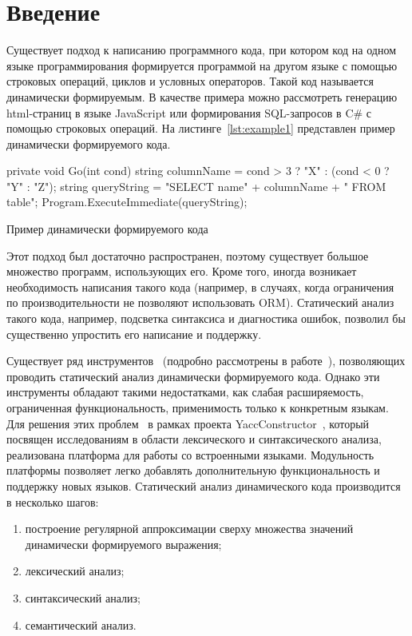\section*{Введение}
Существует подход к написанию программного кода, при котором код на одном языке программирования формируется программой на другом языке с помощью строковых операций, циклов и условных операторов. Такой код называется динамически формируемым. В качестве примера можно рассмотреть генерацию html-страниц в языке JavaScript или формирования SQL-запросов в C\# с помощью строковых операций. На листинге~\ref{lst:example1} представлен пример динамически формируемого кода.

\begin{listing}[H]
    \begin{pyglist}[language=csharp,numbers=left,numbersep=5pt]
 private void Go(int cond){
   string columnName = cond > 3 ? "X" : (cond < 0 ? "Y" : "Z");
   string queryString = 
       "SELECT name" + columnName + " FROM table";
   Program.ExecuteImmediate(queryString);}
    \end{pyglist}
\caption{Пример динамически формируемого кода}
\label{lst:example1}
\end{listing}

Этот подход был достаточно распространен, поэтому существует большое множество программ, использующих его. Кроме того, иногда возникает необходимость написания такого кода (например, в случаях, когда ограничения по производительности не позволяют использовать ORM). Статический анализ такого кода, например, подсветка синтаксиса и диагностика ошибок, позволил бы существенно упростить его написание и поддержку.

Существует ряд инструментов~\cite{Alvor, JSA, PHPSA} (подробно рассмотрены в работе~\cite{polubelova}), позволяющих проводить статический анализ динамически формируемого кода. Однако эти инструменты обладают такими недостатками, как слабая расширяемость, ограниченная функциональность, применимость только к конкретным языкам. Для решения этих проблем~\cite{GrigorievPhd} в рамках проекта YaccConstructor~\cite{YCUrl, articleYC}, который посвящен исследованиям в области лексического и синтаксического анализа, реализована платформа для работы со встроенными языками. Модульность платформы позволяет легко добавлять дополнительную функциональность и поддержку новых языков. Статический анализ динамического кода производится в несколько шагов: 
\begin{enumerate}
\item построение регулярной аппроксимации сверху множества значений динамически формируемого выражения;
\item лексический анализ;
\item синтаксический анализ;
\item семантический анализ.
\end{enumerate}

